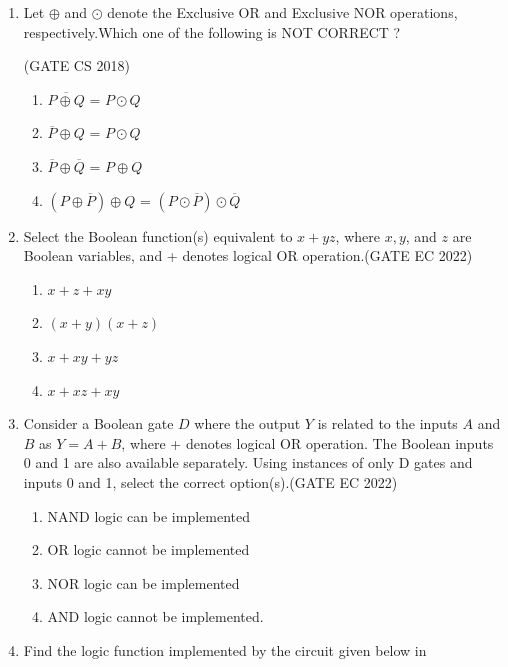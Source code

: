 \begin{enumerate}[label=\arabic*.,ref=\theenumi]
\begin{figure}[H]
{
	}
	\caption{}
\label{fig:2016/gate/in/19}
\end{figure}
\item 
\label{prob:2018-gate-CS-4}		
Let $\oplus$ and $\odot$ denote the Exclusive OR and Exclusive NOR operations, respectively.Which one of the following is NOT CORRECT ?

\hfill (GATE CS 2018)
\begin{enumerate}[label=(\Alph*)]
    \item $\overline{P\oplus Q}$ = $ P \odot Q $
    \item $\overline{P} \oplus Q$ = $ P \odot Q $
    \item $\overline{P} \oplus \overline{Q}$ = $ P \oplus Q $
    \item $(P \oplus \overline{P}) \oplus Q$ = $(P \odot \overline{P}) \odot \overline{Q}$
\end{enumerate}
\item Select the Boolean function(s) equivalent to $x + yz$, where $x,y$, and $z$ are Boolean variables, and + denotes logical OR  operation.\hfill(GATE EC 2022)
	\begin{enumerate}[label=(\Alph*)]
		\item $x + z + {xy}$
		\item ${(x + y)}{(x + z)}$
		\item $x + {xy} + {yz}$
		\item $x + {xz} + {xy}$
	\end{enumerate}
\item 
Consider a Boolean gate $D$ where the output $Y$ is related to the inputs $A$ and $B$ as $Y = A + B$, where + denotes logical OR operation. The Boolean inputs 0 and 1 are also available separately. Using instances of only D gates and inputs 0 and 1, select the correct option(s).\hfill{(GATE EC 2022)}
\begin{enumerate}
\item  NAND logic can be implemented
\item  OR logic cannot be implemented
\item  NOR logic can be implemented
\item  AND logic cannot be implemented.
\end{enumerate}
\item 
\label{prob:2018-gate-ee-14}
Find the logic function implemented by the circuit given below 
in 


\end{enumerate}
